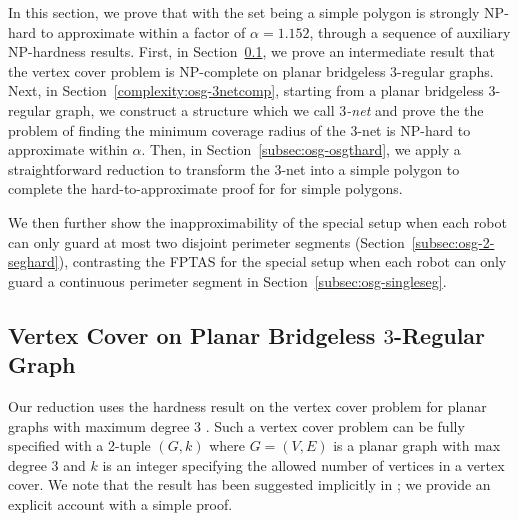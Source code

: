 In this section, we prove that \osgt with the set being a simple polygon is 
strongly NP-hard to approximate within a factor of $\alpha = 1.152$, through 
a sequence of auxiliary NP-hardness results. 
%
First, in Section~\ref{subsec:osg-3regular}, we prove an intermediate result 
that the vertex cover problem is NP-complete on planar bridgeless 
$3$-regular graphs.
% 
Next, in Section~\ref{complexity:osg-3netcomp}, starting from a planar bridgeless 
$3$-regular graph, we construct a structure which we call {\em $3$-net} and 
prove the the problem of finding the minimum coverage radius of the 
$3$-net is NP-hard to approximate within $\alpha$. 
% 
Then, in Section~\ref{subsec:osg-osgthard}, we apply a straightforward 
reduction to transform the $3$-net into a simple polygon to complete
the hard-to-approximate proof for \osgt for simple polygons.
%

We then further show the inapproximability of the special \opgt setup 
when each robot can only guard at most two disjoint perimeter segments 
(Section~\ref{subsec:osg-2-seghard}), contrasting the FPTAS for the special 
\opgt setup when each robot can only guard a continuous perimeter 
segment in Section~\ref{subsec:osg-singleseg}.

\subsection{Vertex Cover on Planar Bridgeless $3$-Regular Graph}\label{subsec:osg-3regular}
Our reduction uses the hardness result on the vertex cover problem for planar 
graphs with maximum degree $3$ \cite{garey1977rectilinear}. Such a vertex cover 
problem can be fully specified with a 2-tuple $(G, k)$ where $G = (V, E)$ is a 
planar graph with max degree $3$ and $k$ is an integer specifying the allowed 
number of vertices in a vertex cover. We note that the result has been 
suggested implicitly in \cite{mohar2001face}; we provide an explicit account 
with a simple proof. 

